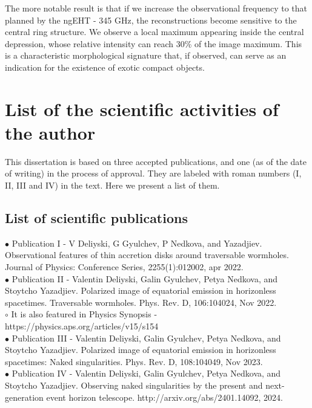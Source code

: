 \documentclass[12pt]{article}
\numberwithin{equation}{section}
\numberwithin{figure}{section}
\begin{document}
	The more notable result is that if we increase the observational frequency to that planned by the ngEHT - 345 GHz, the reconstructions become sensitive to the central ring structure. We observe a local maximum appearing inside the central depression, whose relative intensity can reach 30\% of the image maximum. This is a characteristic morphological signature that, if observed, can serve as an indication for the existence of exotic compact objects.
	
	\section{List of the scientific activities of the author}
	
	This dissertation is based on three accepted publications, and one (as of the date of writing) in the process of approval. They are labeled with roman numbers (I, II, III and IV) in the text. Here we present a list of them.
	
	\subsection{List of scientific publications}
	
	$\bullet$ Publication I - V Deliyski, G Gyulchev, P Nedkova, and Yazadjiev. Observational features of thin accretion disks around traversable wormholes. Journal of Physics: Conference Series, 2255(1):012002, apr 2022.\\
	
	\noindent$\bullet$ Publication II - Valentin Deliyski, Galin Gyulchev, Petya Nedkova, and Stoytcho Yazadjiev. Polarized image of equatorial emission in horizonless spacetimes. Traversable wormholes. Phys. Rev. D, 106:104024, Nov 2022.\\
	
	\indent$\circ$ It is also featured in Physics Synopsis - https://physics.aps.org/articles/v15/s154\\
	
	\noindent$\bullet$ Publication III - Valentin Deliyski, Galin Gyulchev, Petya Nedkova, and Stoytcho Yazadjiev. Polarized image of equatorial emission in horizonless spacetimes: Naked singularities. Phys. Rev. D, 108:104049, Nov 2023.\\
	
	\noindent$\bullet$ Publication IV - Valentin Deliyski, Galin Gyulchev, Petya Nedkova, and Stoytcho Yazadjiev. Observing naked singularities by the present and next-generation event horizon telescope. http://arxiv.org/abs/2401.14092, 2024.
	
\end{document}

